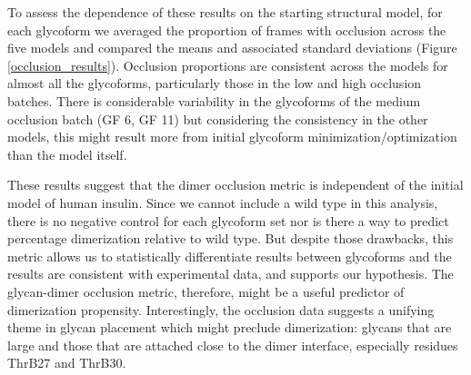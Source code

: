 \documentclass[9pt]{elife}
\begin{document}
To assess the dependence of these results on the starting structural model, for each glycoform we averaged the proportion of frames with occlusion across the five models and compared the means and associated standard deviations (Figure \ref{occlusion_results}). Occlusion proportions are consistent across the models for almost all the glycoforms, particularly those in the low and high occlusion batches. There is considerable variability in the glycoforms of the medium occlusion batch (GF 6, GF 11) but considering the consistency in the other models, this might result more from initial glycoform minimization/optimization than the model itself.

These results suggest that the dimer occlusion metric is independent of the initial model of human insulin. Since we cannot include a wild type in this analysis, there is no negative control for each glycoform set nor is there a way to predict percentage dimerization relative to wild type. But despite those drawbacks, this metric allows us to statistically differentiate results between glycoforms and the results are consistent with experimental data, and supports our hypothesis. The glycan-dimer occlusion metric, therefore, might be a useful predictor of dimerization propensity. Interestingly, the occlusion data suggests a unifying theme in glycan placement which might preclude dimerization: glycans that are large and those that are attached close to the dimer interface, especially residues ThrB27 and ThrB30.
\end{document}
